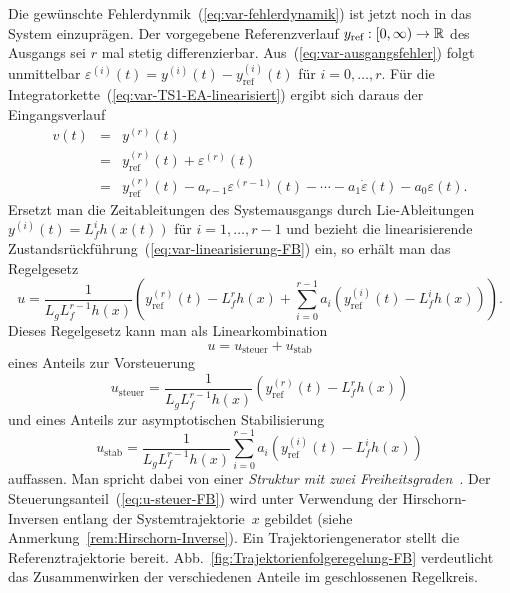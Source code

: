 Die gewünschte Fehlerdynmik~(\ref{eq:var-fehlerdynamik}) ist jetzt
noch in das System einzuprägen. Der vorgegebene Referenzverlauf $y_{\text{ref}}:[0,\infty)\to{\mathbb{R}}$
des Ausgangs sei $r$ mal stetig differenzierbar. Aus~(\ref{eq:var-ausgangsfehler})
folgt unmittelbar $\varepsilon^{(i)}(t)=y^{(i)}(t)-y_{\text{ref}}^{(i)}(t)$
für $i=0,\ldots,r$. Für die Integratorkette~(\ref{eq:var-TS1-EA-linearisiert})
ergibt sich daraus der Eingangsverlauf
\begin{equation}
\begin{array}{lcl}
v(t) & = & y^{(r)}(t)\\
 & = & y_{\text{ref}}^{(r)}(t)+\varepsilon^{(r)}(t)\\
 & = & y_{\text{ref}}^{(r)}(t)-a_{r-1}\varepsilon^{(r-1)}(t)-\cdots-a_{1}\dot{\varepsilon}(t)-a_{0}\varepsilon(t).
\end{array}\label{eq:var-PD-verallg}
\end{equation}
Ersetzt man die Zeitableitungen des Systemausgangs durch Lie-Ableitungen
$y^{(i)}(t)=L_{f}^{i}h(x(t))$ für $i=1,\ldots,r-1$ und bezieht die
linearisierende Zustandsrückführung~(\ref{eq:var-linearisierung-FB})
ein, so erhält man das Regelgesetz 
\begin{equation}
u=\frac{1}{L_{g}L_{f}^{r-1}h(x)}\left(y_{\text{ref}}^{(r)}(t)-L_{f}^{r}h(x)+\sum_{i=0}^{r-1}a_{i}\left(y_{\text{ref}}^{(i)}(t)-L_{f}^{i}h(x)\right)\right).\label{eq:folgeregelung-feedback}
\end{equation}
Dieses Regelgesetz kann man als Linearkombination 
\[
u=u_{\text{steuer}}+u_{\text{stab}}
\]
eines Anteils zur Vorsteuerung
\begin{equation}
u_{\text{steuer}}=\frac{1}{L_{g}L_{f}^{r-1}h(x)}\left(y_{\text{ref}}^{(r)}(t)-L_{f}^{r}h(x)\right)\label{eq:u-steuer-FB}
\end{equation}
und eines Anteils zur asymptotischen Stabilisierung 
\begin{equation}
u_{\text{stab}}=\frac{1}{L_{g}L_{f}^{r-1}h(x)}\sum_{i=0}^{r-1}a_{i}\left(y_{\text{ref}}^{(i)}(t)-L_{f}^{i}h(x)\right)\label{eq:u-stab-FB}
\end{equation}
auffassen. Man spricht dabei von einer \emph{Struktur mit zwei Freiheits\-graden}~\cite{horowitz1963synthesis,kreisselmeier1999}.
Der Steuerungsanteil~(\ref{eq:u-steuer-FB}) wird unter Verwendung
der Hirschorn-Inversen entlang der Systemtrajektorie~$x$
gebildet (siehe Anmerkung~\ref{rem:Hirschorn-Inverse}). Ein Trajektoriengenerator
stellt die Referenztrajektorie bereit. Abb.~\ref{fig:Trajektorienfolgeregelung-FB}
verdeutlicht das Zusammenwirken der verschiedenen Anteile im geschlossenen
Regelkreis.

